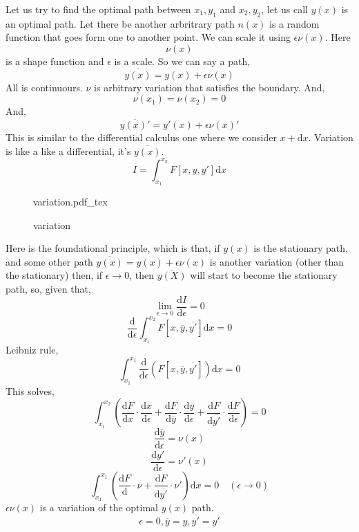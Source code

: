 \documentclass[a4paper, 11pt,twoside]{memoir}
\newcommand{\incfig}[1]{%
    \def\svgwidth{\columnwidth}
    {#1.pdf_tex}
}
\begin{document}
        Let us try to find the optimal path between $x_1,y_1$ and $x_2, y_2$, let us call $y(x)$ is an optimal path. Let there be another arbritrary path $n(x)$ is a random function that goes form one to another point. We can scale it using $\epsilon \nu(x)$. Here \[ 
            \nu(x)
        \] is a shape function and $\epsilon$ is a scale. So we can say a path,
        \[ 
            \overline{y(x)} = y(x) + \epsilon \nu(x)
        \] 
        All is continuours. $\nu$ is arbitrary variation that satisfies the boundary. And, 
        \[ 
            \nu(x_1) = \nu(x_2)=0
        \] And, 
        \[ 
            \overline{y(x)'} = y'(x) + \epsilon \nu(x)'
        \]This is similar to the differential calculus one where we consider $x+\mathrm{d} x$. Variation is like a like a differential, it's $\overline{y(x)}$.  
        \[ 
            I = \int_{x_1}^{x_2}  F[x,y,y'] \mathrm{d}  x 
        \] 
\begin{figure}[ht!]
    \centering
    \incfig{variation}
    \caption{variation}
    \label{fig:variation}
\end{figure}
        Here is the foundational principle, which is that, if $y(x)$ is the stationary path, and some other path $\overline{y(x)} = y(x) + \epsilon \nu(x)$ is another variation (other than the stationary) then, if $\epsilon \to 0$, then $\overline{y(X)}$ will start to become the stationary path, so, given that, 
        \[ 
            \lim_{\epsilon \to 0} \frac{\mathrm{d} I}{\mathrm{d} \epsilon} = 0
        \] 
\[ 
    \frac{\mathrm{d} }{\mathrm{d} \epsilon} \int_{x_1}^{x_2} F[x,\overline{y},\overline{y'} ] \mathrm{d}  x = 0
\] Leibniz rule,
\[ 
    \int_{x_1}^{x_1} \frac{\mathrm{d} }{\mathrm{d} \epsilon} \left( F[x,\overline{y},\overline{y'}] \right) \mathrm{d} x = 0 
\] 
This solves,
\[ 
    \int_{x_1}^{x_2} \left( 
\frac{\mathrm{d} F}{\mathrm{d} x} \cdot \frac{\mathrm{d} x}{\mathrm{d} \epsilon} + \frac{\mathrm{d} F}{\mathrm{d} \overline{y}} \cdot  \frac{\mathrm{d} \overline{y}}{\mathrm{d} \epsilon} + \frac{\mathrm{d} F}{\mathrm{d} \overline{y'}}\cdot  \frac{\mathrm{d} F}{\mathrm{d} \epsilon} 
    \right) = 0 
\]
\[ 
    \frac{\mathrm{d} \overline{y}}{\mathrm{d} \epsilon} = \nu(x)
\] 
\[ 
    \frac{\mathrm{d} \overline{y'}}{\mathrm{d} \epsilon} = \nu'(x)
\] 
\[ 
\int_{x_1}^{x_1}  
\left( 
\frac{\mathrm{d} F}{\mathrm{d} } \cdot  \nu + \frac{\mathrm{d} F }{\mathrm{d} \overline{y'}} \cdot \nu'  
\right) \mathrm{d} x = 0 \quad (\epsilon \to 0) 
\] 
        $\epsilon \nu(x)$ is a variation of the optimal $y(x)$ path. 
\[ 
\epsilon = 0, \overline{y} = y, \overline{y'} = y'
\]
\end{document}
